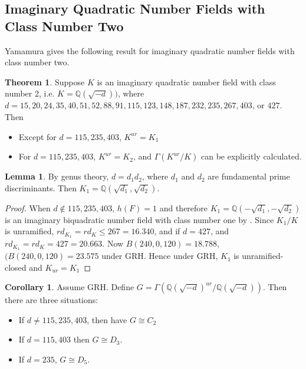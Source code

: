 \documentclass[12pt]{extarticle}
\newcommand{\Q}{\mathbb{Q}}
\newcommand{\<}{\langle}
\renewcommand{\>}{\rangle}
\theoremstyle{definition}
\newtheorem{theorem}{Theorem}
\newtheorem{corollary}{Corollary}
\newtheorem{lemma}{Lemma}
\begin{document}
\subsection{Imaginary Quadratic Number Fields with Class Number Two}
Yamamura \cite{YAMAMURA1996} gives the following result for imaginary quadratic number fields with class number two.
\begin{theorem}
Suppose $K$ is an imaginary quadratic number field with class number 2, i.e. $K=\Q(\sqrt{-d}))$, where $d= 15, 20, 24, 35, 40, 51, 52, 88, 91, 115, 123, 148, 187, 232, 235, 267, 403$, or $427$. Then \begin{itemize}
\item Except for $d = 115, 235, 403$, $K^{ur} = K_1$
\item For $d = 115, 235, 403$, $K^{ur} = K_2$, and $\Gamma(K^{ur}/K)$ can be explicitly calculated. 
\end{itemize}
\end{theorem}
\begin{lemma}
\label{lem:gen}
By genus theory, $d= d_1d_2$, where $d_1$ and $d_2$ are fundamental prime discriminants. Then $K_1 = \Q(\sqrt{d_1},\sqrt{d_2})$. 
\end{lemma}
\begin{proof}
When $d \not \in {115, 235, 403}$, $h(F)=1$ and therefore 
$K_1 =\Q \left(- \sqrt{d_1}, - \sqrt{d_2} \right)$ is an imaginary biquadratic number field with class number one by . Since $K_1/K$ is unramified, $rd_{K_1}=rd_K \leq 267=16.340$, and if $d = 427$, and $rd_{K_1}=rd_K = 427=20.663$. Now $B(240, 0, 120) = 18.788$, $(B(240, 0, 120) = 23.575$ under GRH. Hence under GRH, $K_1$ is unramified-closed and $K_{ur}=K_1$ 
\end{proof}
\begin{corollary}
Assume GRH. Define $G = \Gamma\left(\Q(\sqrt{-d})^{ur}/\Q(\sqrt{-d})\right)$. Then there are three situations:
\begin{itemize}
\item If $d \neq 115, 235, 403$, then have $ G \cong C_2$
\item If $d = 115,403$ then $G \cong D_3$.
\item If $d = 235$, $G \cong D_5$. 
\end{itemize}
\end{corollary}
\end{document}
